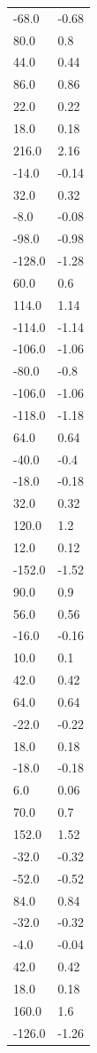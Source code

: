 \begin{longtable}{ll}
-68.0 & -0.68 \\
80.0 & 0.8 \\
44.0 & 0.44 \\
86.0 & 0.86 \\
22.0 & 0.22 \\
18.0 & 0.18 \\
216.0 & 2.16 \\
-14.0 & -0.14 \\
32.0 & 0.32 \\
-8.0 & -0.08 \\
-98.0 & -0.98 \\
-128.0 & -1.28 \\
60.0 & 0.6 \\
114.0 & 1.14 \\
-114.0 & -1.14 \\
-106.0 & -1.06 \\
-80.0 & -0.8 \\
-106.0 & -1.06 \\
-118.0 & -1.18 \\
64.0 & 0.64 \\
-40.0 & -0.4 \\
-18.0 & -0.18 \\
32.0 & 0.32 \\
120.0 & 1.2 \\
12.0 & 0.12 \\
-152.0 & -1.52 \\
90.0 & 0.9 \\
56.0 & 0.56 \\
-16.0 & -0.16 \\
10.0 & 0.1 \\
42.0 & 0.42 \\
64.0 & 0.64 \\
-22.0 & -0.22 \\
18.0 & 0.18 \\
-18.0 & -0.18 \\
6.0 & 0.06 \\
70.0 & 0.7 \\
152.0 & 1.52 \\
-32.0 & -0.32 \\
-52.0 & -0.52 \\
84.0 & 0.84 \\
-32.0 & -0.32 \\
-4.0 & -0.04 \\
42.0 & 0.42 \\
18.0 & 0.18 \\
160.0 & 1.6 \\
-126.0 & -1.26 \\

\end{longtable}
